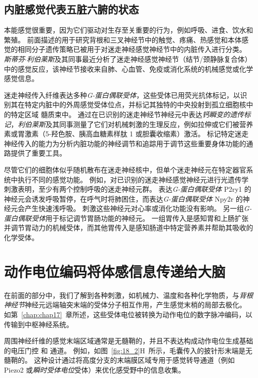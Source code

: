\subsection{内脏感觉代表五脏六腑的状态}

本能感觉很重要，因为它们驱动对生存至关重要的行为，例如呼吸、进食、饮水和繁殖。
前面描述的用于研究背根和三叉神经节中的触觉、疼痛、热感觉和本体感觉的相同分子遗传策略已被用于对迷走神经感觉神经节中的内脏传入进行分类。
\textit{斯蒂芬$\cdot$利伯莱斯}及其同事最近分析了迷走神经感觉神经节（结节/颈静脉复合体）中的感觉反应，该神经节接收来自肺、心血管、免疫或消化系统的机械感觉或化学感觉信息。


迷走神经传入纤维表达多种\textit{G-蛋白偶联受体}，这些受体已用荧光抗体标记，以识别其在特定内脏中的外周感觉受体位点，并标记其独特的中央投射到孤立细胞核中的特定区域 髓质束中。
通过在已识别的迷走神经节神经元中表达\textit{钙瞬变的遗传标记}，\textit{利伯莱斯}及其同事测量了它们对机械刺激的生理反应，例如拉伸或它们被营养素或胃激素（5-羟色胺、胰高血糖素样肽 1 或胆囊收缩素）激活。
标记特定迷走神经传入的能力为分析内脏功能的神经调节和追踪用于调节这些重要身体功能的通路提供了重要工具。


尽管它们的细胞体似乎随机散布在迷走神经核中，但单个迷走神经元在特定器官系统中执行不同的感觉功能。
例如，对已识别的迷走神经感觉神经元进行光遗传学刺激表明，至少有两个控制呼吸的迷走神经元群。
表达\textit{G-蛋白偶联受体} P2ry1 的神经元会诱发呼吸暂停，在呼气时将肺困住，而表达\textit{G-蛋白偶联受体} Npy2r 的神经元会产生快速浅呼吸。
刺激这些神经元对心率或消化功能没有影响。
另一组\textit{G-蛋白偶联受体}用于标记调节胃肠功能的神经元。
一组胃传入是感知胃和上肠扩张并调节胃动力的机械受体，而其他胃传入是感知肠道中特定营养素并帮助其吸收的化学受体。



\section{动作电位编码将体感信息传递给大脑}

在前面的部分中，我们了解到各种刺激，如机械力、温度和各种化学物质，与\textit{背根神经节}神经元远端轴突末端的受体分子相互作用，产生感觉末梢的局部去极化。
如第~\ref{chap:chap17}~章所述，这些受体电位被转换为动作电位的数字脉冲编码，以传输到中枢神经系统。


周围神经纤维的感觉末端区域通常是无髓鞘的，并且不表达构成动作电位生成基础的电压门控  和  通道。
例如，如图~\ref{fig:18_2}H~所示，毛囊传入的披针形末端是无髓鞘的。
这种设计通过将高度分支的末端膜区域专用于感觉转导通道（例如 Piezo2 或\textit{瞬时受体电位}受体）来优化感受野中的信息收集。


